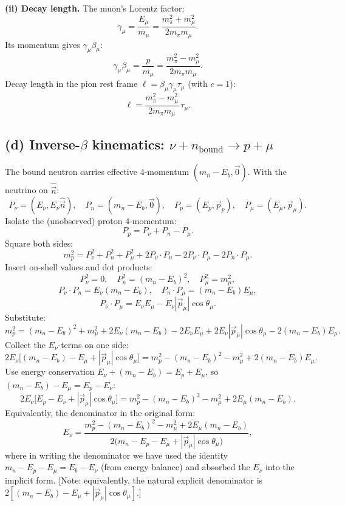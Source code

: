 \documentclass[11pt]{article}
\begin{document}
\textbf{(ii) Decay length.} The muon's Lorentz factor:
\[ \gamma_{\mu}=\frac{E_{\mu}}{m_{\mu}}=\frac{m_{\pi}^{2}+m_{\mu}^{2}}{2m_{\pi}m_{\mu}}. \]
Its momentum gives $\gamma_{\mu}\beta_{\mu}$:
\[ \gamma_{\mu}\beta_{\mu}=\frac{p}{m_{\mu}}=\frac{m_{\pi}^{2}-m_{\mu}^{2}}{2m_{\pi}m_{\mu}}. \]
Decay length in the pion rest frame $\ell=\beta_{\mu}\gamma_{\mu}\tau_{\mu}$ (with $c=1$):
\begin{equation}
\boxed{\;\ell=\frac{m_{\pi}^{2}-m_{\mu}^{2}}{2m_{\pi}m_{\mu}}\,\tau_{\mu}.\;}
\end{equation}

\subsection*{(d) Inverse-$\beta$ kinematics: $\nu+n_{\text{bound}}\to p+\mu$}

The bound neutron carries effective 4-momentum $(m_{n}-E_{b},\vec 0)$. With the neutrino on $\hat{\vec n}$:
\[ P_{\nu}=(E_{\nu},E_{\nu}\hat{\vec n}),\quad P_{n}=(m_{n}-E_{b},\vec 0),\quad P_{p}=(E_{p},\vec p_{p}),\quad P_{\mu}=(E_{\mu},\vec p_{\mu}). \]
Isolate the (unobserved) proton 4-momentum:
\[ P_{p}=P_{\nu}+P_{n}-P_{\mu}. \]
Square both sides:
\[ m_{p}^{2}=P_{\nu}^{2}+P_{n}^{2}+P_{\mu}^{2}+2P_{\nu}\!\cdot\!P_{n}-2P_{\nu}\!\cdot\!P_{\mu}-2P_{n}\!\cdot\!P_{\mu}. \]
Insert on-shell values and dot products:
\[ P_{\nu}^{2}=0,\quad P_{n}^{2}=(m_{n}-E_{b})^{2},\quad P_{\mu}^{2}=m_{\mu}^{2}, \]
\[ P_{\nu}\!\cdot\!P_{n}=E_{\nu}(m_{n}-E_{b}),\quad P_{n}\!\cdot\!P_{\mu}=(m_{n}-E_{b})E_{\mu}, \]
\[ P_{\nu}\!\cdot\!P_{\mu}=E_{\nu}E_{\mu}-E_{\nu}|\vec p_{\mu}|\cos\theta_{\mu}. \]
Substitute:
\[ m_{p}^{2}=(m_{n}-E_{b})^{2}+m_{\mu}^{2}+2E_{\nu}(m_{n}-E_{b})-2E_{\nu}E_{\mu}+2E_{\nu}|\vec p_{\mu}|\cos\theta_{\mu}-2(m_{n}-E_{b})E_{\mu}. \]
Collect the $E_{\nu}$-terms on one side:
\[ 2E_{\nu}\big[(m_{n}-E_{b})-E_{\mu}+|\vec p_{\mu}|\cos\theta_{\mu}\big]=m_{p}^{2}-(m_{n}-E_{b})^{2}-m_{\mu}^{2}+2(m_{n}-E_{b})E_{\mu}. \]
Use energy conservation $E_{\nu}+(m_{n}-E_{b})=E_{p}+E_{\mu}$, so $(m_{n}-E_{b})-E_{\mu}=E_{p}-E_{\nu}$:
\[ 2E_{\nu}\big[E_{p}-E_{\nu}+|\vec p_{\mu}|\cos\theta_{\mu}\big]=m_{p}^{2}-(m_{n}-E_{b})^{2}-m_{\mu}^{2}+2E_{\mu}(m_{n}-E_{b}). \]
Equivalently, the denominator in the original form:
\begin{equation}
\boxed{\;E_{\nu}=\frac{m_{p}^{2}-(m_{n}-E_{b})^{2}-m_{\mu}^{2}+2E_{\mu}(m_{n}-E_{b})}{2\big(m_{n}-E_{p}-E_{\mu}+|\vec p_{\mu}|\cos\theta_{\mu}\big)},\;}
\end{equation}
where in writing the denominator we have used the identity $m_{n}-E_{p}-E_{\mu}=E_{b}-E_{\nu}$ (from energy balance) and absorbed the $E_{\nu}$ into the implicit form. [Note: equivalently, the natural explicit denominator is $2[(m_{n}-E_{b})-E_{\mu}+|\vec p_{\mu}|\cos\theta_{\mu}]$.]
\end{document}
